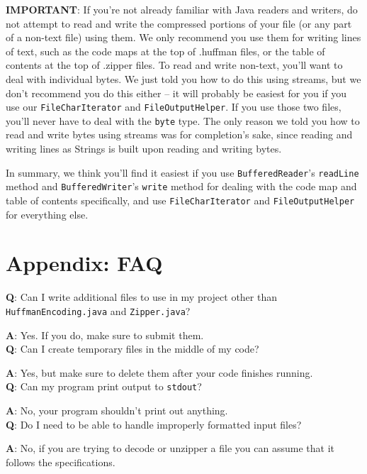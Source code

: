 \documentclass[11pt]{article}
\begin{document}
\textbf{IMPORTANT}: If you're not already familiar with Java readers and writers, do not attempt to read and write the compressed portions of your file (or any part of a non-text file) using them. We only recommend you use them for writing lines of text, such as the code maps at the top of .huffman files, or the table of contents at the top of .zipper files. To read and write non-text, you'll want to deal with individual bytes. We just told you how to do this using streams, but we don't recommend you do this either -- it will probably be easiest for you if you use our \texttt{FileCharIterator} and \texttt{FileOutputHelper}. If you use those two files, you'll never have to deal with the \texttt{byte} type. The only reason we told you how to read and write bytes using streams was for completion's sake, since reading and writing lines as Strings is built upon reading and writing bytes.

In summary, we think you'll find it easiest if you use \texttt{BufferedReader}'s \texttt{readLine} method and \texttt{BufferedWriter}'s \texttt{write} method for dealing with the code map and table of contents specifically, and use \texttt{FileCharIterator} and \texttt{FileOutputHelper} for everything else.

\newpage
\section*{Appendix: FAQ}

\textbf{Q}: Can I write additional files to use in my project other than \texttt{HuffmanEncoding.java} and \texttt{Zipper.java}?

\textbf{A}: Yes. If you do, make sure to submit them.\\

\textbf{Q}: Can I create temporary files in the middle of my code?

\textbf{A}: Yes, but make sure to delete them after your code finishes running.\\

\textbf{Q}: Can my program print output to \texttt{stdout}?

\textbf{A}: No, your program shouldn't print out anything.\\

\textbf{Q}: Do I need to be able to handle improperly formatted input files?

\textbf{A}: No, if you are trying to decode or unzipper a file you can assume that it follows the specifications.\\
\end{document}
